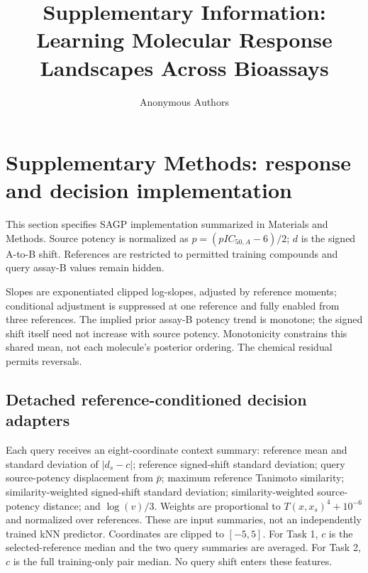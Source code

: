 \documentclass[letterpaper]{article}
\author{Anonymous Authors}
\title{Supplementary Information: Learning Molecular Response Landscapes Across Bioassays}
\date{}
\begin{document}
\maketitle
\graphicspath{{../outputs/figures/}}
\renewcommand{\thetable}{S\arabic{table}}
\renewcommand{\thefigure}{S\arabic{figure}}
\section{Supplementary Methods: response and decision implementation}

This section specifies SAGP implementation summarized in Materials and Methods. Source potency is normalized as $p=(pIC_{50,A}-6)/2$; $d$ is the signed A-to-B shift. References are restricted to permitted training compounds and query assay-B values remain hidden.

Slopes are exponentiated clipped log-slopes, adjusted by reference moments; conditional adjustment is suppressed at one reference and fully enabled from three references. The implied prior assay-B potency trend is monotone; the signed shift itself need not increase with source potency. Monotonicity constrains this shared mean, not each molecule's posterior ordering. The chemical residual permits reversals.

\subsection{Detached reference-conditioned decision adapters}

Each query receives an eight-coordinate context summary: reference mean and standard deviation of $|d_s-c|$; reference signed-shift standard deviation; query source-potency displacement from $\bar p$; maximum reference Tanimoto similarity; similarity-weighted signed-shift standard deviation; similarity-weighted source-potency distance; and $\log(v)/3$. Weights are proportional to $T(x,x_s)^4+10^{-6}$ and normalized over references. These are input summaries, not an independently trained kNN predictor. Coordinates are clipped to $[-5,5]$. For Task 1, $c$ is the selected-reference median and the two query summaries are averaged. For Task 2, $c$ is the full training-only pair median. No query shift enters these features.
\end{document}
